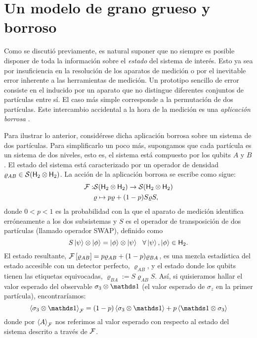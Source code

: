 \section{Un modelo de grano grueso y borroso}\label{sec:CH2CG}

Como se discutió previamente, es natural suponer que no siempre es posible disponer de toda la información sobre el \textit{estado} del sistema de interés. Esto ya sea por insuficiencia en la resolución de los aparatos de medición o por el inevitable error inherente a las herramientas de medición. Un prototipo sencillo de error consiste en el inducido por un aparato que no distingue diferentes conjuntos de partículas entre sí. El caso más simple corresponde a la permutación de dos partículas. Este intercambio accidental a la hora de la medición es una \textit{aplicación borrosa} \cite{FuzzyMeasurements}.

Para ilustrar lo anterior, considérese dicha aplicación borrosa sobre un sistema de dos partículas. Para simplificarlo un poco más, supongamos que cada partícula es un sistema de dos niveles, esto es, el sistema está compuesto por los qubits $A$ y $B$. El estado del sistema está caracterizado por un operador de densidad $\varrho_{AB} \in \mathcal{S}({\sf H}_2 \otimes {\sf H}_2)$. La acción de la aplicación borrosa se escribe como sigue:
\begin{align*}
\mathcal{F}:&\mathcal{S}({\sf H}_2 \otimes {\sf H}_2)\to \mathcal{S}({\sf H}_2 \otimes {\sf H}_2)\nonumber\\
&\varrho \mapsto p\varrho+(1-p)S\varrho S,
\end{align*}
donde $0<p<1$ es la probabilidad con la que el aparato de medición identifica erróneamente a los dos subsistemas y $S$ es el operador de transposición de dos partículas (llamado operador SWAP), definido como 
\begin{equation*}
    S\ket{\psi}\otimes \ket{\phi}=\ket{\phi}\otimes \ket{\psi} \ \ \forall \ket{\psi},\ket{\phi}\in {\sf H}_2.
\end{equation*}
El estado resultante, $\mathcal{F}\left[\varrho_{AB}\right]=p\varrho_{AB}+(1-p)\varrho_{BA}$, es una mezcla estadística del estado accesible con un detector perfecto, $\varrho_{AB}$, y el estado donde los qubits tienen las etiquetas equivocadas, $\varrho_{BA}:=S\varrho_{AB} S$. Así, si quisieramos hallar el valor esperado del observable $\sigma_{3}\otimes\Id$ (el valor esperado de $\sigma_{z}$ en la primer partícula), encontraríamos:
\begin{equation*}
    \expval{\sigma_{3}\otimes\Id}_{\mcF}=(1-p)\expval{\sigma_{3}\otimes\Id}+p\expval{\Id\otimes\sigma_{3}}
\end{equation*}
donde por $\expval{A}_{\mathcal{F}}$ nos referimos al valor esperado con respecto al estado del sistema descrito a través de $\mathcal{F}$.

